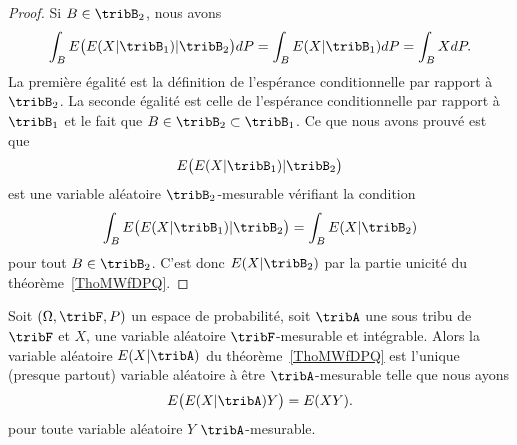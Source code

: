 \begin{proof}
	Si \( B\in\tribB_2\), nous avons
	\begin{equation}
		\int_BE\big( E(X|\tribB_1)|\tribB_2 \big)dP=\int_B E(X|\tribB_1)dP=\int_BXdP.
	\end{equation}
	La première égalité est la définition de l'espérance conditionnelle par rapport à \( \tribB_2\). La seconde égalité est celle de l'espérance conditionnelle par rapport à \( \tribB_1\) et le fait que \( B\in\tribB_2\subset\tribB_1\). Ce que nous avons prouvé est que
	\begin{equation}
		E\big( E(X|\tribB_1)|\tribB_2 \big)
	\end{equation}
	est une variable aléatoire \( \tribB_2\)-mesurable vérifiant la condition
	\begin{equation}
		\int_BE\big( E(X|\tribB_1)|\tribB_2 \big)=\int_BE(X|\tribB_2)
	\end{equation}
	pour tout \( B\in \tribB_2\). C'est donc \( E(X|\tribB_2)\) par la partie unicité du théorème~\ref{ThoMWfDPQ}.
\end{proof}

\begin{proposition}
	Soit \( (\Omega,\tribF,P)\) un espace de probabilité, soit \( \tribA\) une sous tribu de \( \tribF\) et \( X\), une variable aléatoire \( \tribF\)-mesurable et intégrable. Alors la variable aléatoire \( E(X|\tribA)\) du théorème~\ref{ThoMWfDPQ} est l'unique (presque partout) variable aléatoire à être \( \tribA\)-mesurable telle que nous ayons
	\begin{equation}
		E\big( E(X|\tribA)Y \big)=E(XY).
	\end{equation}
	pour toute variable aléatoire \( Y\) \( \tribA\)-mesurable.
\end{proposition}

